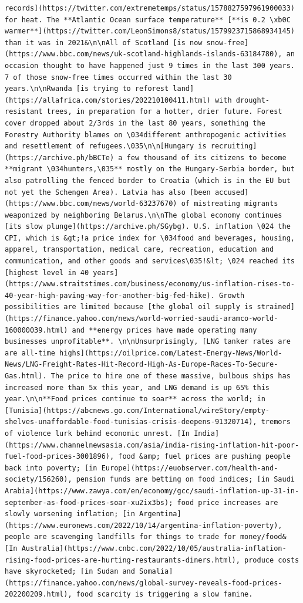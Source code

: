 \documentclass[
  letterpaper,
  DIV=11,
  numbers=noendperiod]{scrreprt}
\begin{document}
\begin{verbatim}
records](https://twitter.com/extremetemps/status/1578827597961900033) for heat. The **Atlantic Ocean surface temperature** [**is 0.2 \xb0C warmer**](https://twitter.com/LeonSimons8/status/1579923715868934145) than it was in 2021&\n\nAll of Scotland [is now snow-free](https://www.bbc.com/news/uk-scotland-highlands-islands-63184780), an occasion thought to have happened just 9 times in the last 300 years. 7 of those snow-free times occurred within the last 30 years.\n\nRwanda [is trying to reforest land](https://allafrica.com/stories/202210100411.html) with drought-resistant trees, in preparation for a hotter, drier future. Forest cover dropped about 2/3rds in the last 80 years, something the Forestry Authority blames on \034different anthropogenic activities and resettlement of refugees.\035\n\n[Hungary is recruiting](https://archive.ph/bBCTe) a few thousand of its citizens to become **migrant \034hunters,\035** mostly on the Hungary-Serbia border, but also patrolling the fenced border to Croatia (which is in the EU but not yet the Schengen Area). Latvia has also [been accused](https://www.bbc.com/news/world-63237670) of mistreating migrants weaponized by neighboring Belarus.\n\nThe global economy continues [its slow plunge](https://archive.ph/SGybg). U.S. inflation \024 the CPI, which is &gt;!a price index for \034food and beverages, housing, apparel, transportation, medical care, recreation, education and communication, and other goods and services\035!&lt; \024 reached its [highest level in 40 years](https://www.straitstimes.com/business/economy/us-inflation-rises-to-40-year-high-paving-way-for-another-big-fed-hike). Growth possibilities are limited because [the global oil supply is strained](https://finance.yahoo.com/news/world-worried-saudi-aramco-world-160000039.html) and **energy prices have made operating many businesses unprofitable**. \n\nUnsurprisingly, [LNG tanker rates are are all-time highs](https://oilprice.com/Latest-Energy-News/World-News/LNG-Freight-Rates-Hit-Record-High-As-Europe-Races-To-Secure-Gas.html). The price to hire one of these massive, bulbous ships has increased more than 5x this year, and LNG demand is up 65% this year.\n\n**Food prices continue to soar** across the world; in [Tunisia](https://abcnews.go.com/International/wireStory/empty-shelves-unaffordable-food-tunisias-crisis-deepens-91320714), tremors of violence lurk behind economic unrest. [In India](https://www.channelnewsasia.com/asia/india-rising-inflation-hit-poor-fuel-food-prices-3001896), food &amp; fuel prices are pushing people back into poverty; [in Europe](https://euobserver.com/health-and-society/156260), pension funds are betting on food indices; [in Saudi Arabia](https://www.zawya.com/en/economy/gcc/saudi-inflation-up-31-in-september-as-food-prices-soar-xu2ix3bs); food price increases are slowly worsening inflation; [in Argentina](https://www.euronews.com/2022/10/14/argentina-inflation-poverty), people are scavenging landfills for things to trade for money/food& [In Australia](https://www.cnbc.com/2022/10/05/australia-inflation-rising-food-prices-are-hurting-restaurants-diners.html), produce costs have skyrocketed; [in Sudan and Somalia](https://finance.yahoo.com/news/global-survey-reveals-food-prices-202200209.html), food scarcity is triggering a slow famine. 
\end{verbatim}
\end{document}
